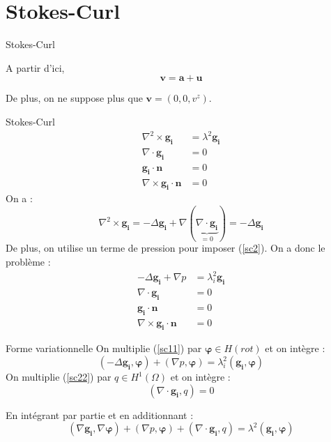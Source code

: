 \documentclass{beamer}
\newcommand{\grad}{{\nabla}}
\newcommand{\laplace}{{\Delta}}
\newcommand{\rot}{{\nabla\times}}
\newcommand{\rott}{{\nabla^2\times}}
\renewcommand{\div}{{\nabla\cdot}}
\begin{document}
\section{Stokes-Curl}
\begin{frame}{Stokes-Curl}
\begin{alertblock}{A partir d'ici,}
\[\bm{v}=\bm{a}+\bm{u}\]
\end{alertblock}

De plus, on ne suppose plus que $\bm{v}=(0,0,v^z)$.
\end{frame}

\begin{frame}{Stokes-Curl}
\begin{align}
\rott \bm{g_i} &= \lambda^2\bm{g_i}\label{sc1}\\
\div \bm{g_i} &= 0\label{sc2}\\
\bm{g_i}\cdot\bm{n}&=0\\
\rot\bm{g_i}\cdot\bm{n}&=0
\end{align}
On a :
\[
\rott\bm{g_i}=-\laplace\bm{g_i}+\grad(\underbrace{\div\bm{g_i}}_{=0})=-\laplace\bm{g_i}
\]
De plus, on utilise un terme de pression pour imposer (\ref{sc2}). On a donc le problème :
\begin{align}
-\laplace \bm{g_i} + \grad p &= \lambda^2_i\bm{g_i}\label{sc11}\\
\div\bm{g_i} &= 0\label{sc22}\\
\bm{g_i}\cdot\bm{n}&=0\\
\rot\bm{g_i}\cdot\bm{n}&=0
\end{align}
\end{frame}

\begin{frame}{Forme variationnelle}
On multiplie (\ref{sc11}) par $\bm{\varphi}\in H(rot)$ et on intègre :
\[
(-\laplace\bm{g_i},\bm{\varphi})+(\grad p,\bm{\varphi}) = \lambda^2_i (\bm{g_i},\bm{\varphi})
\]
On multiplie (\ref{sc22}) par $q\in H^1(\Omega)$ et on intègre :
\[
(\div\bm{g_i},q) = 0
\]
\begin{block}{En intégrant par partie et en additionnant :}
\[
(\grad\bm{g_i},\grad\bm{\varphi}) + (\grad p, \bm{\varphi}) + (\div\bm{g_i},q) = \lambda^2(\bm{g_i},\bm{\varphi})
\]
\end{block}
\end{frame}
\end{document}
